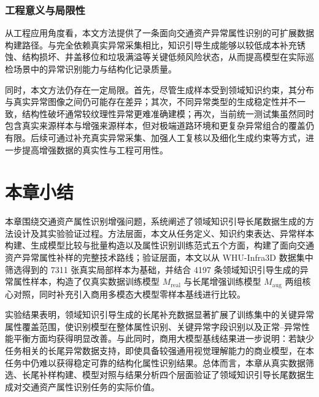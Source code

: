 \subsubsection{工程意义与局限性}

从工程应用角度看，本文方法提供了一条面向交通资产异常属性识别的可扩展数据构建路径。与完全依赖真实异常采集相比，知识引导生成能够以较低成本补充锈蚀、结构损坏、井盖移位和垃圾满溢等关键低频风险状态，从而提高模型在实际巡检场景中的异常识别能力与结构化记录质量。

同时，本文方法仍存在一定局限。首先，尽管生成样本受到领域知识约束，其分布与真实异常图像之间仍可能存在差异；其次，不同异常类型的生成稳定性并不一致，结构性破坏通常较纹理性异常更难准确建模；再次，当前统一测试集虽然同时包含真实来源样本与增强来源样本，但对极端道路环境和更复杂异常组合的覆盖仍有限。后续可通过补充真实异常采集、加强人工复核以及细化生成约束等方式，进一步提高增强数据的真实性与工程可用性。

\section{本章小结}

本章围绕交通资产属性识别增强问题，系统阐述了领域知识引导长尾数据生成的方法设计及其实验验证过程。方法层面，本文从任务定义、知识约束表达、异常样本构建、生成模型比较与批量构造以及属性识别训练范式五个方面，构建了面向交通资产异常属性补样的完整技术路线；验证层面，本文以从 WHU-Infra3D 数据集中筛选得到的 7311 张真实局部样本为基础，并结合 4197 条领域知识引导生成的异常属性样本，构造了仅真实数据训练模型 $M_{\mathrm{real}}$ 与长尾增强训练模型 $M_{\mathrm{aug}}$ 两组核心对照，同时补充引入商用多模态大模型零样本基线进行比较。

实验结果表明，领域知识引导生成的长尾补充数据显著扩展了训练集中的关键异常属性覆盖范围，使识别模型在整体属性识别、关键异常字段识别以及正常--异常性能平衡方面均获得明显改善。与此同时，商用大模型基线结果进一步说明：若缺少任务相关的长尾异常数据支持，即使具备较强通用视觉理解能力的商业模型，在本任务中仍难以获得稳定可靠的结构化属性识别结果。总体而言，本章从真实数据筛选、长尾补样构建、模型对照与结果分析四个层面验证了领域知识引导长尾数据生成对交通资产属性识别任务的实际价值。
